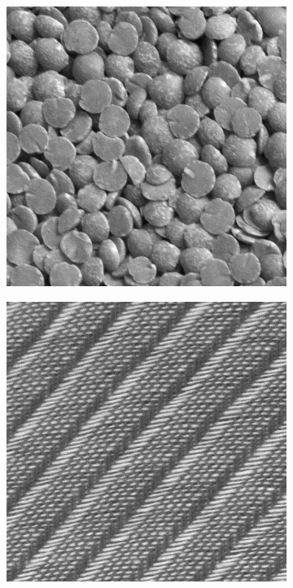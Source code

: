 \begin{figure}[H]
\begin{subfigure}{.15\textwidth}
  \includegraphics[width=.8\linewidth]{kylberg_examples/lentils1_001.png}
\end{subfigure}
\begin{subfigure}{.15\textwidth}
  \centering
  \includegraphics[width=.8\linewidth]{kylberg_examples/screen1_001.png}
\end{subfigure}


\end{figure}
